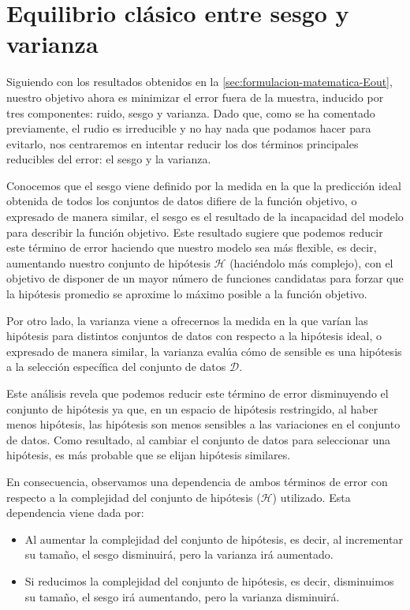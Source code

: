 \section{Equilibrio clásico entre sesgo y varianza}\label{sec:equilibrio-sesgo-varianza}
Siguiendo con los resultados obtenidos en la \autoref{sec:formulacion-matematica-Eout}, nuestro objetivo ahora es minimizar el error fuera de la muestra, inducido por tres componentes: ruido, sesgo y varianza. Dado que, como se ha comentado previamente, el rudio es irreducible y no hay nada que podamos hacer para evitarlo, nos centraremos en intentar reducir los dos términos principales reducibles del error: el sesgo y la varianza.\newline

Conocemos que el sesgo viene definido por la medida en la que la predicción ideal obtenida de todos los conjuntos de datos difiere de la función objetivo, o expresado de manera similar, el sesgo es el resultado de la incapacidad del modelo para describir la función objetivo. Este resultado sugiere que podemos reducir este término de error haciendo que nuestro modelo sea más flexible, es decir, aumentando nuestro conjunto de hipótesis $\mathcal{H}$ (haciéndolo más complejo), con el objetivo de disponer de un mayor número de funciones candidatas para forzar que la hipótesis promedio se aproxime lo máximo posible a la función objetivo.\newline

Por otro lado, la varianza viene a ofrecernos la medida en la que varían las hipótesis para distintos conjuntos de datos con respecto a la hipótesis ideal, o expresado de manera similar, la varianza evalúa cómo de sensible es una hipótesis a la selección específica del conjunto de datos $\mathcal{D}$.\newline

Este análisis revela que podemos reducir este término de error disminuyendo el conjunto de hipótesis ya que, en un espacio de hipótesis restringido, al haber menos hipótesis, las hipótesis son menos sensibles a las variaciones en el conjunto de datos. Como resultado, al cambiar el conjunto de datos para seleccionar una hipótesis, es más probable que se elijan hipótesis similares.\newline

En consecuencia, observamos una dependencia de ambos términos de error con respecto a la complejidad del conjunto de hipótesis ($\mathcal{H}$) utilizado. Esta dependencia viene dada por:

\begin{itemize}
    \item Al aumentar la complejidad del conjunto de hipótesis, es decir, al incrementar su tamaño, el sesgo disminuirá, pero la varianza irá aumentado.
    \item Si reducimos la complejidad del conjunto de hipótesis, es decir, disminuimos su tamaño, el sesgo irá aumentando, pero la varianza disminuirá.\newline
\end{itemize}

